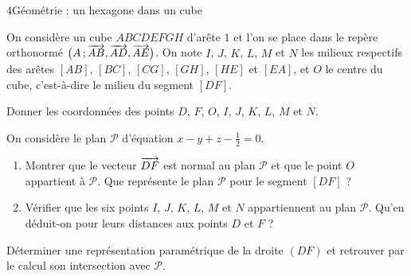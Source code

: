 \begin{exoBac}{4}{Géométrie : un hexagone dans un cube}
\begin{codecote}[0.6]
On considère un cube $ABCDEFGH$ d'arête $1$ et l'on se place dans le repère orthonormé $\big(A\,{;}\,\overrightarrow{AB},\overrightarrow{AD},\overrightarrow{AE}\big)$. On note
$I$, $J$, $K$, $L$, $M$ et $N$ les milieux respectifs des arêtes $[AB]$, $[BC]$, $[CG]$, $[GH]$, $[HE]$ et $[EA]$, et $O$ le centre du
cube, c'est-à-dire le milieu du segment $[DF]$.
\begin{questions}
  \item Donner les coordonnées des points $D$, $F$, $O$, $I$, $J$, $K$, $L$, $M$ et $N$.
  \item On considère le plan $\mathcal{P}$ d'équation $x-y+z-\frac12=0$.
    \begin{enumerate}[label=\alph*),leftmargin=1.4em,itemsep=0.4mm,topsep=0.4mm]
      \item Montrer que le vecteur $\overrightarrow{DF}$ est normal au plan $\mathcal{P}$ et que le point $O$ appartient à $\mathcal{P}$. Que
        représente le plan $\mathcal{P}$ pour le segment $[DF]$ ?
      \item Vérifier que les six points $I$, $J$, $K$, $L$, $M$ et $N$ appartiennent au plan $\mathcal{P}$. Qu'en déduit-on pour leurs
        distances aux points $D$ et $F$ ?
    \end{enumerate}
\end{questions}
\cote
\centering
{}
\end{codecote}
\begin{questions}[start=3]
  \item Déterminer une représentation paramétrique de la droite $(DF)$ et retrouver par le calcul son intersection avec $\mathcal{P}$.

\end{questions}
\end{exoBac}
